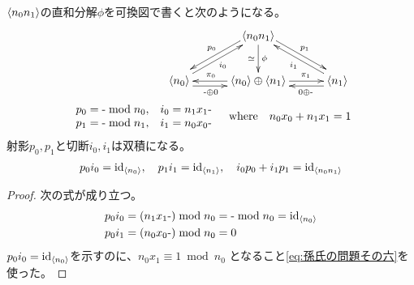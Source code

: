 	$\mathinner{\langle{n_0n_1}\rangle}$の直和分解$\phi$を可換図で書くと次のようになる。
	\begin{equation*}\begin{split}
		\xymatrix@C=3em{
			& \braket{n_0n_1} \ar@<-1ex>[ld]_{p_0} \ar@<1ex>[rd]^{p_1}
				\ar[d]^\phi_{\simeq} \\
			\braket{n_0} \ar@<-1ex>[r]_(0.4){\myhere\oplus0} \ar[ur]_{i_0}
			& \braket{n_0}\oplus\braket{n_1}
				\ar[l]_(0.6){\pi_0} \ar[r]^(0.6){\pi_1}
			& \braket{n_1} \ar@<+1ex>[l]^(0.4){0\oplus\myhere} \ar[ul]^{i_1}
		} \\
		\begin{array}{ll}
			p_0 = \myhere\bmod n_0, & i_0 = n_1x_1\myhere \\
			p_1 = \myhere\bmod n_1, & i_1 = n_0x_0\myhere \\
		\end{array}\quad\text{where}\quad n_0x_0 + n_1x_1 = 1
	\end{split}\end{equation*}
	射影$p_0,p_1$と切断$i_0,i_1$は双積になる。
	\begin{equation*}\begin{split}
		p_0i_0 = {\operatorname{id}}_{\mathinner{\langle{n_0}\rangle}},\quad p_1i_1 = {\operatorname{id}}_{\mathinner{\langle{n_1}\rangle}}
		,\quad i_0p_0 + i_1p_1 = {\operatorname{id}}_{\mathinner{\langle{n_0n_1}\rangle}}
	\end{split}\end{equation*}
	\begin{proof} 次の式が成り立つ。
	\begin{equation*}\begin{split}
		p_0i_0 &= (n_1x_1\myhere)\bmod n_0 = \myhere\bmod n_0
		= \id_{\braket{n_0}} \\
		p_0i_1 &= (n_0x_0\myhere)\bmod n_0 = 0
	\end{split}\end{equation*}
	$p_0i_0={\operatorname{id}}_{\mathinner{\langle{n_0}\rangle}}$を示すのに、$n_0x_1\equiv 1\bmod n_0$
	となること\eqref{eq:孫氏の問題その六}を使った。
	\end{proof}

